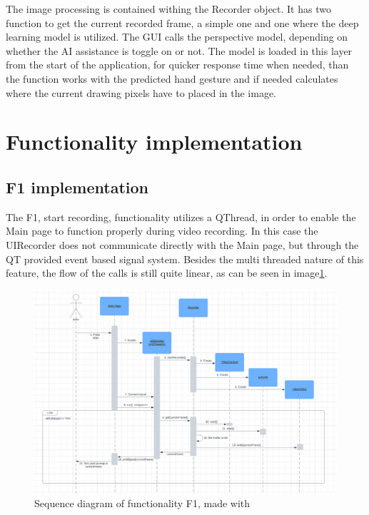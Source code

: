 \par The image processing is contained withing the Recorder object. It has two function to get the current recorded frame, a simple one and one where the deep learning model is utilized. The GUI calls the perspective model, depending on whether the AI assistance is toggle on or not. The model is loaded in this layer from the start of the application, for quicker response time when needed, than the function works with the predicted hand gesture and if needed calculates where the current drawing pixels have to placed in the image.

\section{Functionality implementation}
\label{sec:designsec2}

\subsection{F1 implementation}
\label{sec:designsec2subsec1}

\par The F1, start recording, functionality utilizes a QThread, in order to enable the Main page to function properly during video recording. In this case the UIRecorder does not communicate directly with the Main page, but through the QT provided event based signal system. Besides the multi threaded nature of this feature, the flow of the calls is still quite linear, as can be seen in image\ref{fig:F1Sequence}.

\begin{figure}
    \centering
    \includegraphics[width=0.8\linewidth]{figures/F1Sequence.png}
    \caption{Sequence diagram of functionality F1, made with \cite{lucidchart}}
    \label{fig:F1Sequence}
\end{figure}

